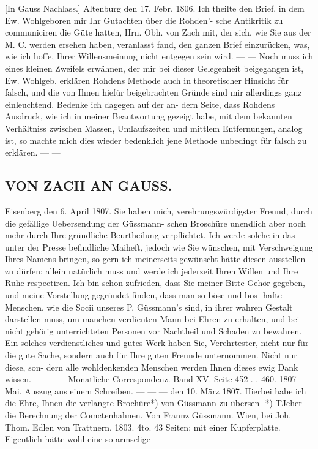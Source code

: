 \documentclass[10pt,a4paper]{article}
\begin{document}
[In  Gauss  Nachlass.]
Altenburg  den  17.  Febr.  1806.
Ich  theilte  den  Brief,  in  dem  Ew.  Wohlgeboren  mir  Ihr  Gutachten  über  die  Rohden'-
sche  Antikritik  zu  communiciren  die  Güte  hatten,  Hrn.  Obh.  von  Zach  mit,  der  sich,  wie  Sie  aus  der
M.  C.  werden  ersehen  haben,  veranlasst  fand,  den  ganzen  Brief  einzurücken,  was,  wie  ich  hoffe,  Ihrer
Willensmeinung  nicht  entgegen  sein  wird.     ---     ---
Noch  muss  ich  eines  kleinen  Zweifels  erwähnen,  der  mir  bei  dieser  Gelegenheit  beigegangen  ist,
Ew.  Wohlgeb.  erklären  Rohdens  Methode  auch  in  theoretischer  Hinsicht  für  falsch,  und  die  von  Ihnen
hiefür  beigebrachten  Gründe  sind  mir  allerdings  ganz  einleuchtend.  Bedenke  ich  dagegen  auf  der  an-
dern Seite,  dass  Rohdens  Ausdruck,  wie  ich  in  meiner  Beantwortung  gezeigt  habe,  mit  dem  bekannten
Verhältniss  zwischen  Massen,  Umlaufszeiten  und  mittlem  Entfernungen,  analog  ist,  so  machte  mich  dies
wieder  bedenklich  jene  Methode  unbedingt  für  falsch  zu  erklären.  ---  ---
\subsection*{VON  ZACH  AN  GAUSS.}

Eisenberg  den  6.  April  1807.
Sie  haben  mich,  verehrungswürdigster  Freund,  durch  die  gefällige  Uebersendung  der  Güssmann-
schen  Broschüre  unendlich  aber  noch  mehr  durch  Ihre  gründliche  Beurtheilung  verpflichtet.  Ich  werde
solche  in  das  unter  der  Presse  befindliche  Maiheft,  jedoch  wie  Sie  wünschen,  mit  Verschweigung  Ihres
Namens  bringen,  so  gern  ich  meinerseits  gewünscht  hätte  diesen  ausstellen  zu  dürfen;  allein  natürlich
muss  und  werde  ich  jederzeit  Ihren  Willen  und  Ihre  Ruhe  respectiren.  Ich  bin  schon  zufrieden,  dass
Sie  meiner  Bitte  Gehör  gegeben,  und  meine  Vorstellung  gegründet  finden,  dass  man  so  böse  und  bos-
hafte Menschen,  wie  die  Socii  unseres  P.  Güssmann's  sind,  in  ihrer  wahren  Gestalt  darstellen  muss,  um
manchen  verdienten  Mann  bei  Ehren  zu  erhalten,  und  bei  nicht  gehörig  unterrichteten  Personen  vor
Nachtheil  und  Schaden  zu  bewahren.  Ein  solches  verdienstliches  und  gutes  Werk  haben  Sie,  Verehrtester,
nicht  nur  für  die  gute  Sache,  sondern  auch  für  Ihre  guten  Freunde  unternommen.  Nicht  nur  diese,  son-
dern alle  wohldenkenden  Menschen  werden  Ihnen  dieses  ewig  Dank  wissen.  ---     ---     ---
Monatliche  Correspondenz.     Band  XV.  Seite  452  .  .  460.     1807  Mai.
Auszug  aus  einem  Schreiben.
---     ---     ---  den  10.  März  1807.
Hierbei  habe  ich  die  Ehre,  Ihnen  die  verlangte  Brochüre*)   von  Güssmann   zu  übersen-
*)    TJeher  die   Berechnung  der   Comctenhahnen.      Von  Frannz  Güssmann.   Wien,  bei  Joh.  Thom.  Edlen
von  Trattnern,  1803.     4to.     43  Seiten;  mit  einer  Kupferplatte.     Eigentlich    hätte  wohl  eine  so  armselige
\end{document}
